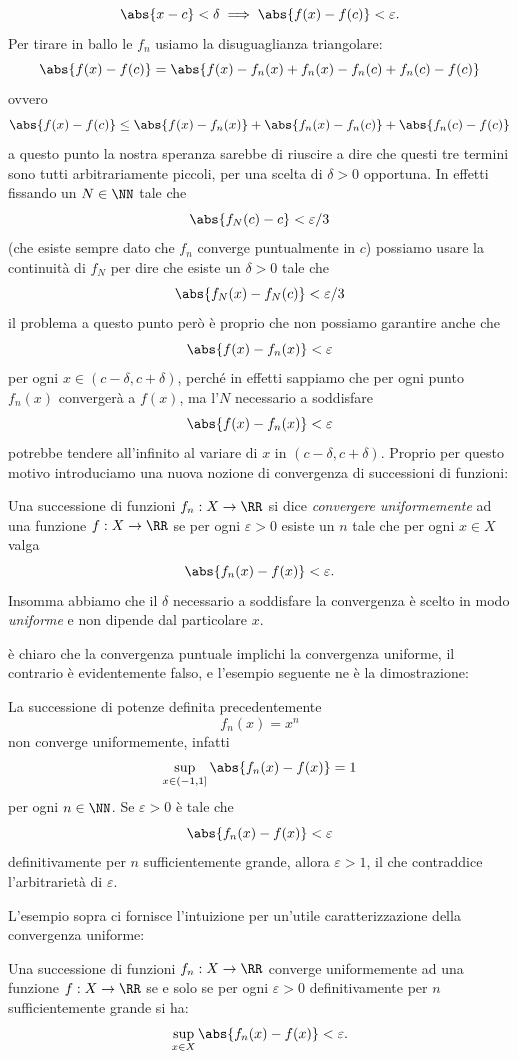 \documentclass[11pt]{scrartcl}
\begin{document}
	$$\abs{x-c}<\delta \implies \abs{f(x)-f(c)}<\varepsilon.$$
	Per tirare in ballo le $f_n$ usiamo la disuguaglianza triangolare:
	$$\abs{f(x)-f(c)}=\abs{f(x)-f_n(x)+f_n(x)-f_n(c)+f_n(c)-f(c)}$$
	ovvero
	$$\abs{f(x)-f(c)}\le \abs{f(x)-f_n(x)}+\abs{f_n(x)-f_n(c)}+\abs{f_n(c)-f(c)}$$
	a questo punto la nostra speranza sarebbe di riuscire a dire che questi tre termini sono tutti arbitrariamente piccoli, per una scelta di $\delta>0$ opportuna. In effetti fissando un $N\in \NN$ tale che
	$$\abs{f_N(c)-c}<\varepsilon/3$$
	(che esiste sempre dato che $f_n$ converge puntualmente in $c$) possiamo usare la continuità di $f_N$ per dire che esiste un $\delta>0$ tale che
	$$\abs{f_N(x)-f_N(c)}<\varepsilon/3$$
	il problema a questo punto però è proprio che non possiamo garantire anche che
	$$\abs{f(x)-f_n(x)}<\varepsilon$$
	per ogni $x\in (c-\delta,c+\delta)$, perché in effetti sappiamo che per ogni punto $f_n(x)$ convergerà a $f(x)$, ma l'$N$ necessario a soddisfare
	$$\abs{f(x)-f_n(x)}<\varepsilon$$
	potrebbe tendere all'infinito al variare di $x$ in $(c-\delta,c+\delta)$. Proprio per questo motivo introduciamo una nuova nozione di convergenza di successioni di funzioni:
	\begin{definition}
		Una successione di funzioni $f_n:X\to\RR$ si dice \textit{convergere uniformemente} ad una funzione $f:X\to\RR$ se per ogni $\varepsilon>0$ esiste un $n$ tale che per ogni $x\in X$ valga
		$$\abs{f_n(x)-f(x)}<\varepsilon.$$ 
		Insomma abbiamo che il $\delta$ necessario a soddisfare la convergenza è scelto in modo \textit{uniforme} e non dipende dal particolare $x$.
	\end{definition}  
	è chiaro che la convergenza puntuale implichi la convergenza uniforme, il contrario è evidentemente falso, e l'esempio seguente ne è la dimostrazione:
	\begin{example}
		La successione di potenze definita precedentemente
		$$f_n(x)=x^n$$
		non converge uniformemente, infatti
		$$\sup_{x\in(-1,1]}\abs{f_n(x)-f(x)}=1$$
		per ogni $n\in\NN$. Se $\varepsilon>0$ è tale che
		$$\abs{f_n(x)-f(x)}<\varepsilon$$
		definitivamente per $n$ sufficientemente grande, allora $\varepsilon>1$, il che contraddice l'arbitrarietà di $\varepsilon$.
	\end{example}
	L'esempio sopra ci fornisce l'intuizione per un'utile caratterizzazione della convergenza uniforme:
	\begin{proposition}
		Una successione di funzioni $f_n:X\to\RR$ converge uniformemente ad una funzione $f:X\to\RR$ se e solo se per ogni $\varepsilon>0$ definitivamente per $n$ sufficientemente grande si ha:
		$$\sup_{x\in X}\abs{f_n(x)-f(x)}<\varepsilon.$$
	\end{proposition}
\end{document}
